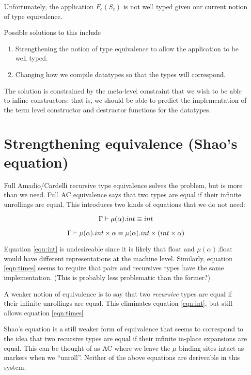 \documentclass[12pt,twoside,fleqn]{article}
\begin{document}
Unfortunately, the application $F_c(S_c)$ is not well typed given our
current notion of type equivalence.

Possible solutions to this include

\begin{enumerate}
\item Strengthening the notion of type equivalence to allow the
  application to be well typed.
\item Changing how we compile datatypes so that the types will
  correspond.
\end{enumerate}

The solution is constrained by the meta-level constraint that we wish
to be able to inline constructors: that is, we should be able to
predict the implementation of the term level constructor and
destructor functions for the datatypes.

\section{Strengthening equivalence (Shao's equation)}

Full Amadio/Cardelli recursive type equivalence \cite{AmCard} solves
the problem, but is more than we need. Full AC equivalence says that
two types are equal if their infinite unrollings are equal.  This
introduces two kinds of equations that we do not need:

\begin{equation}\label{eqn:int}
\Gamma\vdash \mu(\alpha).int \equiv int
\end{equation}

\begin{equation} \label{eqn:times}
\Gamma\vdash \mu(\alpha).int \times\alpha \equiv \mu(\alpha).int\times (int \times \alpha)
\end{equation}

Equation \ref{eqn:int} is undesireable since it is likely that
$\mathrm{float}$ and $\mu(\alpha).\mathrm{float}$ would have different
representations at the machine level.  Similarly, equation
\ref{eqn:times} seems to require that pairs and recursives types have
the same implementation.  (This is probably less problematic than the
former?) 

A weaker notion of equivalence is to say that two \emph{recursive}
types are equal if their infinite unrollings are equal.  This
eliminates equation \ref{eqn:int}, but still allows equation
\ref{eqn:times}

Shao's equation is a still weaker form of equivalence that seems to
correspond to the idea that two recursive types are equal if their
infinite in-place expansions are equal.  This can be thought of as AC
where we leave the $\mu$ binding sites intact as markers when we
``unroll''.  Neither of the above equations are deriveable in this
system.  
\end{document}

